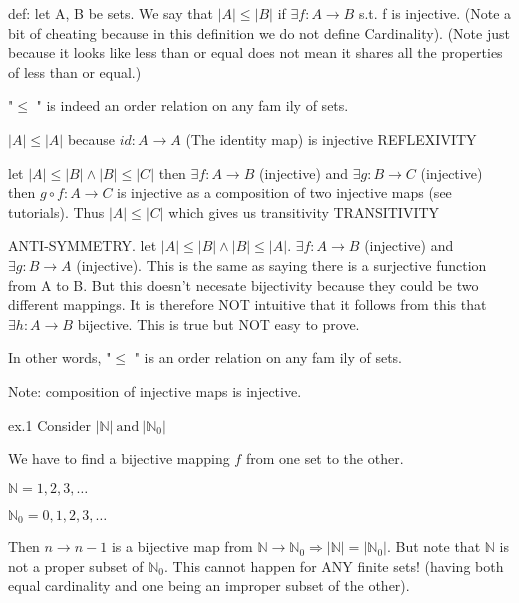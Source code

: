 \documentclass{article}
\begin{document}
def: let A, B be sets. We say that  $|A| \leq |B|$ if $\exists f:A \to B$ s.t. f is injective. (Note a bit of cheating because in this definition we do not define Cardinality). (Note just because it looks like less than or equal does not mean it shares all the properties of less than or equal.)

"$\leq$ " is indeed an order relation on any fam ily of sets.

$|A| \leq |A|$ because $id: A \to A$ (The identity map) is injective REFLEXIVITY

let $|A| \leq |B| \wedge |B| \leq |C|$ then $\exists f:A \to B$ (injective) and $\exists g: B \to C$ (injective) then $g \circ f: A \to C$ is injective as a composition of two injective maps (see tutorials). Thus $|A| \leq |C|$ which gives us transitivity TRANSITIVITY

ANTI-SYMMETRY. let $|A| \leq |B| \wedge |B| \leq |A|$. $\exists f: A \to B$ (injective) and $\exists g: B \to A$ (injective). This is the same as saying there is a surjective function from A to B. But this doesn't necesate bijectivity because they could be two different mappings. It is therefore NOT intuitive that it follows from this that $\exists h: A \to B$ bijective. This is true but NOT easy to prove.


In other words, "$\leq$ " is an order relation on any fam ily of sets.

Note: composition of injective maps is injective.

ex.1 Consider $|\mathbb{N}| \ \text{and} \ |\mathbb{N}_0|$

We have to find a bijective mapping $f$ from one set to the other.

$\mathbb{N} = 1, 2, 3, \dots$

$\mathbb{N}_0 = 0, 1, 2, 3, \dots$

Then  $n \to n - 1$ is a bijective map from $\mathbb{N} \to \mathbb{N}_0 \Rightarrow |\mathbb{N}| = |\mathbb{N}_0|$. But note that $\mathbb{N}$ is not a proper subset of $\mathbb{N}_0$. This cannot happen for ANY finite sets! (having both equal cardinality and one being an improper subset of the other).
\end{document}
